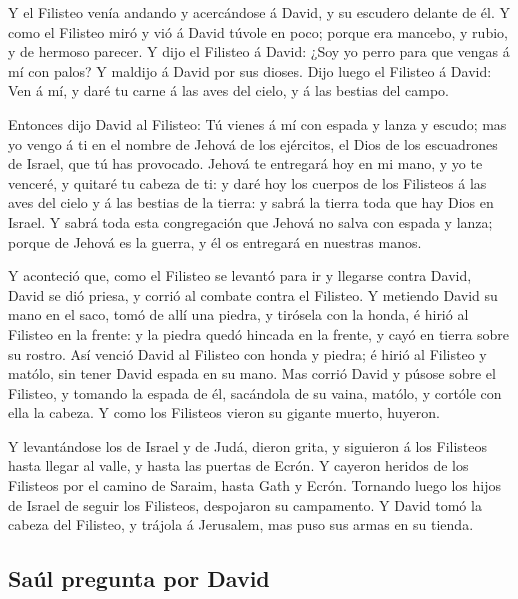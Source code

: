  Y el Filisteo venía andando y acercándose á David, y su
escudero delante de él.  Y como el Filisteo miró y vió á
David túvole en poco; porque era mancebo, y rubio, y de hermoso parecer.
 Y dijo el Filisteo á David: ¿Soy yo perro para que
vengas á mí con palos? Y maldijo á David por sus dioses. 
Dijo luego el Filisteo á David: Ven á mí, y daré tu carne á las aves del
cielo, y á las bestias del campo.

 Entonces dijo David al Filisteo: Tú vienes á mí con
espada y lanza y escudo; mas yo vengo á ti en el nombre de Jehová de los
ejércitos, el Dios de los escuadrones de Israel, que tú has provocado.
 Jehová te entregará hoy en mi mano, y yo te venceré, y
quitaré tu cabeza de ti: y daré hoy los cuerpos de los Filisteos á las
aves del cielo y á las bestias de la tierra: y sabrá la tierra toda que
hay Dios en Israel.  Y sabrá toda esta congregación que
Jehová no salva con espada y lanza; porque de Jehová es la guerra, y él
os entregará en nuestras manos.

 Y aconteció que, como el Filisteo se levantó para ir y
llegarse contra David, David se dió priesa, y corrió al combate contra
el Filisteo.  Y metiendo David su mano en el saco, tomó
de allí una piedra, y tirósela con la honda, é hirió al Filisteo en la
frente: y la piedra quedó hincada en la frente, y cayó en tierra sobre
su rostro.  Así venció David al Filisteo con honda y
piedra; é hirió al Filisteo y matólo, sin tener David espada en su mano.
 Mas corrió David y púsose sobre el Filisteo, y tomando
la espada de él, sacándola de su vaina, matólo, y cortóle con ella la
cabeza. Y como los Filisteos vieron su gigante muerto, huyeron.

 Y levantándose los de Israel y de Judá, dieron grita, y
siguieron á los Filisteos hasta llegar al valle, y hasta las puertas de
Ecrón. Y cayeron heridos de los Filisteos por el camino de Saraim, hasta
Gath y Ecrón.  Tornando luego los hijos de Israel de
seguir los Filisteos, despojaron su campamento.  Y David
tomó la cabeza del Filisteo, y trájola á Jerusalem, mas puso sus armas
en su tienda.

\hypertarget{sauxfal-pregunta-por-david}{%
\subsection{Saúl pregunta por David}\label{sauxfal-pregunta-por-david}}

